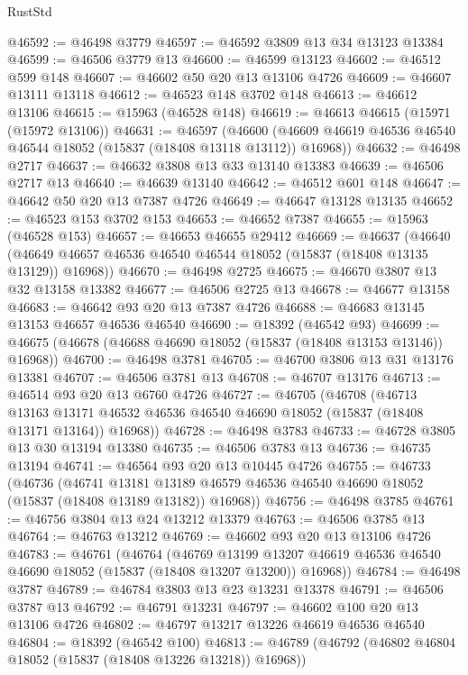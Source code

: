 \begin{lexlean}{RustStd}
\begin{coremodule}
{\begin{coremodule}
{{{{{{{{{{{{{{{{{{{{{{{{{{{{{{{{{{{{{{{{{{{{{{{{{{{{{{{{{{{{@46592 := @46498 @3779
@46597 := @46592 @3809 @13 @34 @13123 @13384
@46599 := @46506 @3779 @13
@46600 := @46599 @13123
@46602 := @46512 @599 @148
@46607 := @46602 @50 @20 @13 @13106 @4726
@46609 := @46607 @13111 @13118
@46612 := @46523 @148 @3702 @148
@46613 := @46612 @13106
@46615 := @15963 (@46528 @148)
@46619 := @46613 @46615 (@15971 (@15972 @13106))
@46631 := @46597
    (@46600 (@46609 @46619 @46536 @46540 @46544 @18052 (@15837 (@18408 @13118 @13112)) @16968))
@46632 := @46498 @2717
@46637 := @46632 @3808 @13 @33 @13140 @13383
@46639 := @46506 @2717 @13
@46640 := @46639 @13140
@46642 := @46512 @601 @148
@46647 := @46642 @50 @20 @13 @7387 @4726
@46649 := @46647 @13128 @13135
@46652 := @46523 @153 @3702 @153
@46653 := @46652 @7387
@46655 := @15963 (@46528 @153)
@46657 := @46653 @46655 @29412
@46669 := @46637
    (@46640 (@46649 @46657 @46536 @46540 @46544 @18052 (@15837 (@18408 @13135 @13129)) @16968))
@46670 := @46498 @2725
@46675 := @46670 @3807 @13 @32 @13158 @13382
@46677 := @46506 @2725 @13
@46678 := @46677 @13158
@46683 := @46642 @93 @20 @13 @7387 @4726
@46688 := @46683 @13145 @13153 @46657 @46536 @46540
@46690 := @18392 (@46542 @93)
@46699 := @46675 (@46678 (@46688 @46690 @18052 (@15837 (@18408 @13153 @13146)) @16968))
@46700 := @46498 @3781
@46705 := @46700 @3806 @13 @31 @13176 @13381
@46707 := @46506 @3781 @13
@46708 := @46707 @13176
@46713 := @46514 @93 @20 @13 @6760 @4726
@46727 := @46705
    (@46708
      (@46713
        @13163
        @13171
        @46532
        @46536
        @46540
        @46690
        @18052
        (@15837 (@18408 @13171 @13164))
        @16968))
@46728 := @46498 @3783
@46733 := @46728 @3805 @13 @30 @13194 @13380
@46735 := @46506 @3783 @13
@46736 := @46735 @13194
@46741 := @46564 @93 @20 @13 @10445 @4726
@46755 := @46733
    (@46736
      (@46741
        @13181
        @13189
        @46579
        @46536
        @46540
        @46690
        @18052
        (@15837 (@18408 @13189 @13182))
        @16968))
@46756 := @46498 @3785
@46761 := @46756 @3804 @13 @24 @13212 @13379
@46763 := @46506 @3785 @13
@46764 := @46763 @13212
@46769 := @46602 @93 @20 @13 @13106 @4726
@46783 := @46761
    (@46764
      (@46769
        @13199
        @13207
        @46619
        @46536
        @46540
        @46690
        @18052
        (@15837 (@18408 @13207 @13200))
        @16968))
@46784 := @46498 @3787
@46789 := @46784 @3803 @13 @23 @13231 @13378
@46791 := @46506 @3787 @13
@46792 := @46791 @13231
@46797 := @46602 @100 @20 @13 @13106 @4726
@46802 := @46797 @13217 @13226 @46619 @46536 @46540
@46804 := @18392 (@46542 @100)
@46813 := @46789 (@46792 (@46802 @46804 @18052 (@15837 (@18408 @13226 @13218)) @16968))
}}}}}}}}}}}}}}}}}}}}}}}}}}}}}}}}}}}}}}}}}}}}}}}}}}}}}}}}}}}}
\end{coremodule}}
\end{coremodule}
\end{lexlean}
